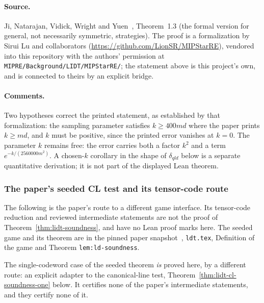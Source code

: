 \paragraph{Source.} Ji, Natarajan, Vidick, Wright and Yuen~\cite{JNVWY21qld},
Theorem~1.3 (the formal version for general, not necessarily symmetric, strategies).
The proof is a formalization by Sirui Lu and collaborators
(\url{https://github.com/LionSR/MIPStarRE}), vendored into this repository with the
authors' permission at \texttt{MIPRE/Background/LIDT/MIPStarRE/}; the statement above is
this project's own, and is connected to theirs by an explicit bridge.

\paragraph{Comments.} Two hypotheses correct the printed statement, as established by
that formalization: the sampling parameter satisfies $k \geq 400md$ where the paper
prints $k \geq md$, and $k$ must be positive, since the printed error vanishes at
$k = 0$. The parameter $k$ remains free: the error carries both a factor $k^2$ and a
term $e^{-k/(2560000m^2)}$. A chosen-$k$ corollary in the shape of $\delta_{qld}$ below
is a separate quantitative derivation; it is not part of the displayed Lean theorem.


\subsubsection{The paper's seeded CL test and its tensor-code route}

The following is the paper's route to a different game interface. Its tensor-code
reduction and reviewed intermediate statements are not the proof of
Theorem~\ref{thm:lidt-soundness}, and have no Lean proof marks here. The seeded game
and its theorem are in the pinned paper snapshot~\cite{AuditSync26},
\texttt{ldt.tex}, Definition of the game and Theorem \texttt{lem:ld-soundness}.

The single-codeword case of the seeded theorem \emph{is} proved here, by a different route:
an explicit adapter to the canonical-line test, Theorem~\ref{thm:lidt-cl-soundness-one} below.
It certifies none of the paper's intermediate statements, and they certify none of it.

